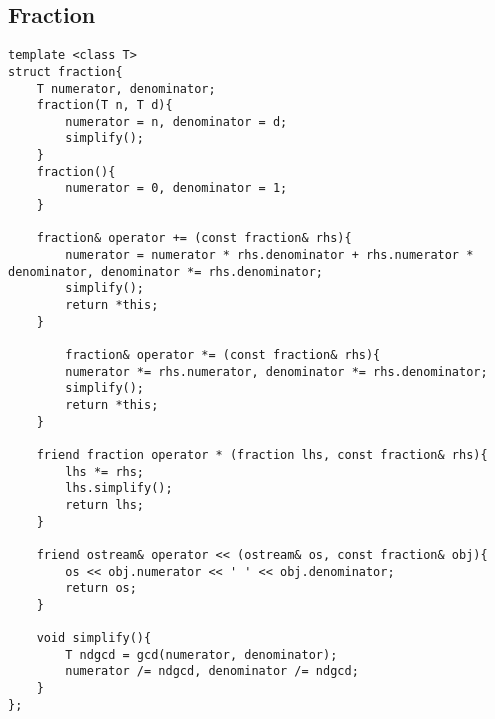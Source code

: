 \subsection{Fraction}
\begin{lstlisting}
template <class T>
struct fraction{
	T numerator, denominator;
	fraction(T n, T d){
		numerator = n, denominator = d;
        simplify();
	}
	fraction(){
		numerator = 0, denominator = 1;
	}

	fraction& operator += (const fraction& rhs){
		numerator = numerator * rhs.denominator + rhs.numerator * denominator, denominator *= rhs.denominator;
        simplify();
		return *this;
    }
        
        fraction& operator *= (const fraction& rhs){
        numerator *= rhs.numerator, denominator *= rhs.denominator;
        simplify();
		return *this;
	}
	
	friend fraction operator * (fraction lhs, const fraction& rhs){
		lhs *= rhs;
        lhs.simplify();
		return lhs;
	}

	friend ostream& operator << (ostream& os, const fraction& obj){
		os << obj.numerator << ' ' << obj.denominator;
		return os;
	}

	void simplify(){
		T ndgcd = gcd(numerator, denominator);
		numerator /= ndgcd, denominator /= ndgcd;
	}
};
\end{lstlisting}